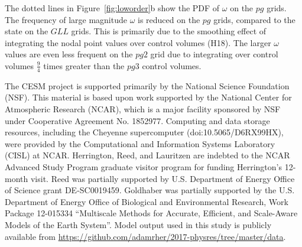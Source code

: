 \documentclass[draft,linenumbers]{agujournal}
\begin{document}
The dotted lines in Figure~\ref{fig:loworder}b show the PDF of $\omega$ on the $pg$ grids. The frequency of large magnitude $\omega$ is reduced on the $pg$ grids, compared to the state on the $GLL$ grids. This is primarily due to the smoothing effect of integrating the nodal point values over control volumes (H18). The larger $\omega$ values are even less frequent on the $pg2$ grid due to integrating over control volumes $\frac{9}{4}$ times greater than the $pg3$ control volumes. 

%
%
%
%
%
%
%

\acknowledgments
The CESM project is supported primarily by the National Science Foundation (NSF). This material is based upon work supported by the National Center for Atmospheric Research (NCAR), which is a major facility sponsored by NSF under Cooperative Agreement No. 1852977. Computing and data storage resources, including the Cheyenne supercomputer (doi:10.5065/D6RX99HX), were provided by the Computational and Information Systems Laboratory (CISL) at NCAR. Herrington, Reed, and Lauritzen are indebted to the NCAR Advanced Study Program graduate visitor program for funding Herrington’s 12-month visit. Reed was partially supported by U.S. Department of Energy Office of Science grant DE-SC0019459. Goldhaber was partially supported by the U.S. Department of Energy Office of Biological and Environmental Research, Work Package 12-015334 ``Multiscale Methods for Accurate, Efficient, and Scale-Aware Models of the Earth System''. Model output used in this study is publicly available from \url{https://github.com/adamrher/2017-physres/tree/master/data}. 

\end{document}
